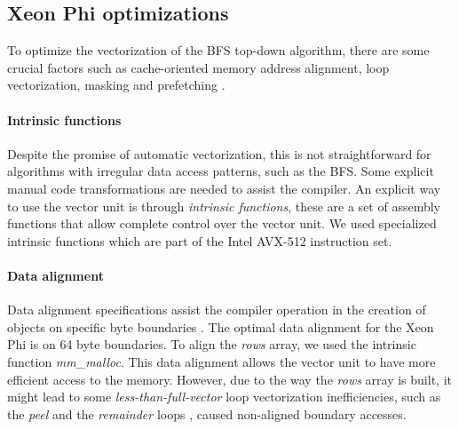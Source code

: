 \documentclass{sig-alternate-05-2015}
\begin{document}
\subsection{Xeon Phi optimizations}
\label{sub:xeonphi}
To optimize the vectorization of the BFS top-down algorithm, there are some crucial factors such as cache-oriented memory address alignment, loop vectorization, masking and prefetching \cite{vecguide}. 

\paragraph{\textbf{Intrinsic functions}}
Despite the promise of automatic vectorization, this is not
straightforward for algorithms with irregular data access patterns,
such as the BFS. Some explicit manual code transformations are needed
to assist the compiler. An explicit way to use the vector unit is
through \textit{intrinsic functions}, these are a set of assembly
functions that allow complete control over the vector unit. We used
specialized intrinsic functions which are part of the Intel AVX-512
instruction set.
\paragraph{\textbf{Data alignment}} 
Data alignment specifications assist the compiler operation in the
creation of objects on specific byte boundaries
\cite{xeonphiBook}. The optimal data alignment for the Xeon Phi is on
64 byte boundaries. To align the \textit{rows} array, we used the
intrinsic function \textit{mm\_malloc}. This data alignment allows the
vector unit to have more efficient access to the memory. However, due
to the way the \textit{rows} array is built, it might lead to some
\textit{less-than-full-vector} loop vectorization inefficiencies, such
as the \textit{peel} and the \textit{remainder} loops
\cite{practicalSIMD}, caused non-aligned boundary accesses.
\end{document}
